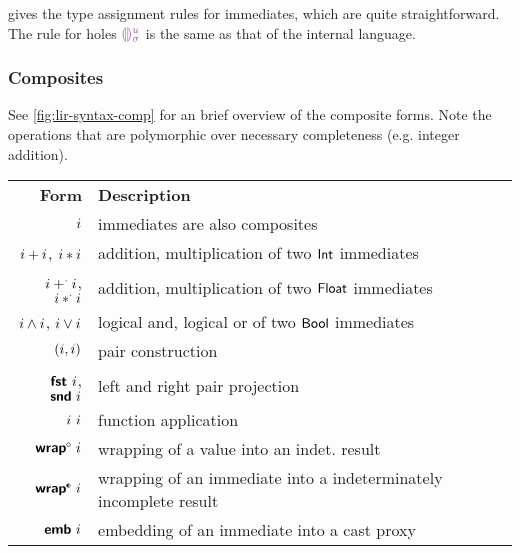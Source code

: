 \documentclass[index.tex]{subfiles}
\begin{document}
 gives the type assignment rules for immediates, which are quite
straightforward. The rule for holes $\IEHole{\HIMV}{\HEMV}$ is the same as
that of the internal \Hazel{} language.

\subsubsection{Composites}
\label{sec:lir-composites}
See \cref{fig:lir-syntax-comp} for an brief overview of the composite forms. Note the operations that
are polymorphic over necessary completeness (e.g. integer addition).

\begin{table}
  \begin{center}
    \begin{tabular}{rl}
      \textbf{Form} & \textbf{Description} \\

      $i$ 
        & immediates are also composites \\
      
      $i + i$, $i * i$
        & addition, multiplication of two $\textsf{Int}$ immediates \\

      $i +^{\cdot} i$, $i *^{\cdot} i$
        & addition, multiplication of two $\textsf{Float}$ immediates \\

      $i \land i$, $i \lor i$
        & logical and, logical or of two $\textsf{Bool}$ immediates \\

      $(i, i)$
        & pair construction \\

      $\textsf{\textbf{fst}}~ i$, $\textsf{\textbf{snd}}~ i$
        & left and right pair projection \\

      $i ~i$
        & function application \\

      $\CWrapIntoNI{\IMV}$
        & wrapping of a value into an indet. result \\

      $\CWrapIntoII{\IMV}$
        & wrapping of an immediate into a indeterminately incomplete
        result \\

      $\textsf{\textbf{emb}}~ i$
        & embedding of an immediate into a cast proxy \\


\end{tabular}
\end{center}
\end{table}
\end{document}
